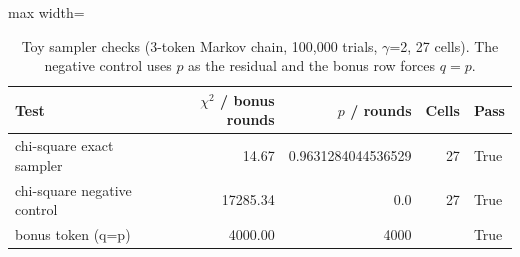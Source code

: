 \begin{table}[!htb]
\centering
\scriptsize
\setlength{\tabcolsep}{3.5pt}
\caption{Toy sampler checks (3-token Markov chain, 100,000 trials, $\gamma$=2, 27 cells). The negative control uses $p$ as the residual and the bonus row forces $q=p$.}
\label{tab:t3toy}
\begin{adjustbox}{max width=\linewidth}
\begin{tabular}{lrrrl}
\toprule
Test & $\chi^2$ / bonus rounds & $p$ / rounds & Cells & Pass \\
\midrule
chi-square exact sampler & 14.67 & 0.9631284044536529 & 27 & True \\
chi-square negative control & 17285.34 & 0.0 & 27 & True \\
bonus token (q=p) & 4000.00 & 4000 &  & True \\
\bottomrule
\end{tabular}
\end{adjustbox}
\end{table}
